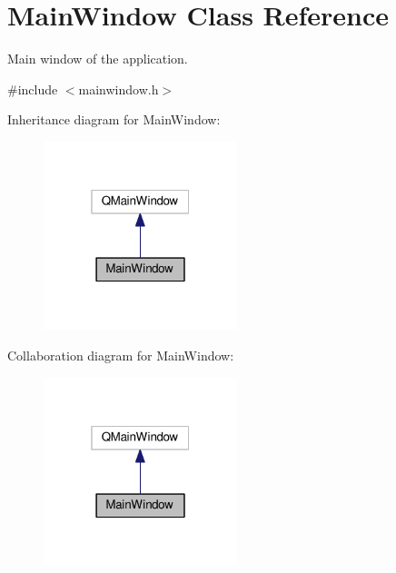 \hypertarget{classMainWindow}{}\section{Main\+Window Class Reference}
\label{classMainWindow}


Main window of the application.  




{\ttfamily \#include $<$mainwindow.\+h$>$}



Inheritance diagram for Main\+Window\+:\nopagebreak
\begin{figure}[H]
\begin{center}
\leavevmode
\includegraphics[width=160pt]{d1/d96/classMainWindow__inherit__graph}
\end{center}
\end{figure}


Collaboration diagram for Main\+Window\+:\nopagebreak
\begin{figure}[H]
\begin{center}
\leavevmode
\includegraphics[width=160pt]{d2/d38/classMainWindow__coll__graph}
\end{center}
\end{figure}
